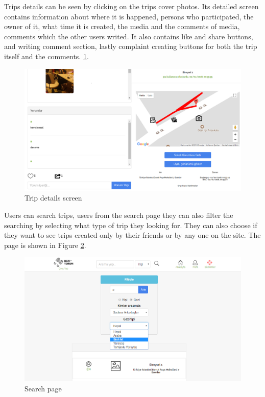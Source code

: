 \newpage

Trips details can be seen by clicking on the trips cover photos. Its detailed screen contains information about where it is happened, persons who participated, the owner of it, what time it is created, the media and the comments of media, comments which the other users writed. It also contains like and share buttons, and writing comment section, lastly complaint creating buttons for both the trip itself and the comments. 
\ref{fig:tripDetail}. 

\begin{figure}[!htbp]
\centering
\includegraphics[width=\textwidth]{projectChapters/images/tripDetail.png}
\caption{Trip details screen}
\label{fig:tripDetail}
\end{figure}

\newpage

Users can search trips, users from the search page they can also filter the searching by selecting what type of trip they looking for. They can also choose if they want to see trips   created only by their friends or by any one on the site. The page is shown in Figure   \ref{fig:searchPageWeb}.

\begin{figure}[!htbp]
\centering
\includegraphics[width=\textwidth]{projectChapters/images/searchPageWeb.png}
\caption{Search page}
\label{fig:searchPageWeb}
\end{figure}

